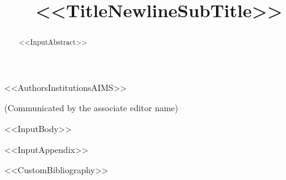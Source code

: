 \documentclass[%
<<DocumentClassOptions>>]{aims}
\title[<<ShortTitle>>]{<<TitleNewlineSubTitle>>}
\author[<<AuthorsFullNamesCommaSeparatedLastAnd>>]{}
\begin{document}
\maketitle

<<AuthorsInstitutionsAIMS>>

\bigskip

\centerline{(Communicated by the associate editor name)}

\begin{abstract}
<<InputAbstract>>
\end{abstract}

<<InputBody>>

\appendix
<<InputAppendix>>


<<CustomBibliography>>
\end{document}
